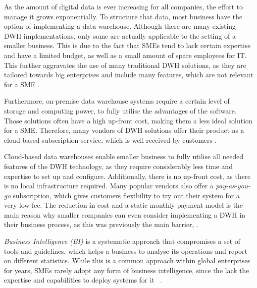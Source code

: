 \documentclass[../paper.tex]{subfiles}
\begin{document}
As the amount of digital data is ever increasing for all companies, the effort to manage it grows exponentially. To structure that data, most business have the option of implementing a data warehouse. Although there are many existing DWH implementations, only some are actually applicable to the setting of a smaller business. This is due to the fact that SMEs tend to lack certain expertise and have a limited budget, as well as a small amount of spare employees for IT. This further aggravates the use of many traditional DWH solutions, as they are tailored towards big enterprises and include many features, which are not relevant for a SME \cite{Raj2016}.

Furthermore, on-premise data warehouse systems require a certain level of storage and computing power, to fully utilise the advantages of the software. Those solutions often have a high up-front cost, making them a less ideal solution for a SME. Therefore, many vendors of DWH solutions offer their product as a cloud-based subscription service, which is well received by customers \cite{Agostino2013}.

Cloud-based data warehouses enable smaller business to fully utilise all needed features of the DWH technology, as they require considerably less time and expertise to set up and configure. Additionally, there is no up-front cost, as there is no local infrastructure required. Many popular vendors also offer a \textit{pay-as-you-go} subscription, which gives customers flexibility to try out their system for a very low fee. The reduction in cost and a static monthly payment model is the main reason why smaller companies can even consider implementing a DWH in their business process, as this was previously the main barrier, \cite{Fernandes2016}.


\textit{Business Intelligence (BI)} is a systematic approach that compromises a set of tools and guidelines, which helps a business to analyse its operations and report on different statistics. While this is a common approach within global enterprises for years, SMEs rarely adopt any form of business intelligence, since the lack the expertise and capabilities to deploy systems for it ~\cite{Golfarelli2004}.
\end{document}
